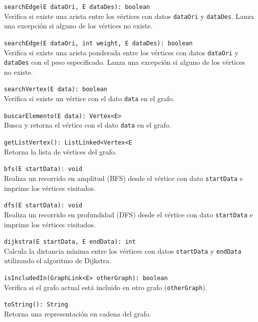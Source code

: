 \documentclass{article}
\begin{document}
\begin{itemize}
                \item \texttt{searchEdge(E dataOri, E dataDes): boolean}\\
                Verifica si existe una arista entre los vértices con datos \texttt{dataOri} y \texttt{dataDes}. Lanza una excepción si alguno de los vértices no existe.
                
                \item \texttt{searchEdge(E dataOri, int weight, E dataDes): boolean}\\
                Verifica si existe una arista ponderada entre los vértices con datos \texttt{dataOri} y \texttt{dataDes} con el peso especificado. Lanza una excepción si alguno de los vértices no existe.
                
                \item \texttt{searchVertex(E data): boolean}\\
                Verifica si existe un vértice con el dato \texttt{data} en el grafo.
                
                {\item \texttt{buscarElemento(E data): Vertex<E>}\\
                Busca y retorna el vértice con el dato \texttt{data} en el grafo.}
                
                {\item \texttt{getListVertex(): ListLinked<Vertex<E\>\>}\\
                Retorna la lista de vértices del grafo.}
                
                \item \texttt{bfs(E startData): void}\\
                Realiza un recorrido en amplitud (BFS) desde el vértice con dato \texttt{startData} e imprime los vértices visitados.
                
                \item \texttt{dfs(E startData): void}\\
                Realiza un recorrido en profundidad (DFS) desde el vértice con dato \texttt{startData} e imprime los vértices visitados.
                
                \item \texttt{dijkstra(E startData, E endData): int}\\
                Calcula la distancia mínima entre los vértices con datos \texttt{startData} y \texttt{endData} utilizando el algoritmo de Dijkstra.
                
                \item \texttt{isIncludedIn(GraphLink<E> otherGraph): boolean}\\
                Verifica si el grafo actual está incluido en otro grafo (\texttt{otherGraph}).
                
                \item \texttt{toString(): String}\\
                Retorna una representación en cadena del grafo.
            \end{itemize}
\end{document}
